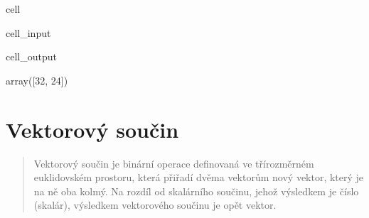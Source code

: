 \documentclass[letterpaper,10pt,english]{jupyterBook}
\begin{document}
\begin{sphinxuseclass}{cell}\begin{sphinxVerbatimInput}

\begin{sphinxuseclass}{cell_input}
\begin{sphinxVerbatim}[commandchars=\\\{\}]
  \PYG{p}{[}\PYG{p}{[}  \PYG{p}{]} \PYG{p}{[}  \PYG{p}{]}\PYG{p}{]}
  \PYG{p}{[}\PYG{p}{[}  \PYG{p}{]} \PYG{p}{[}  \PYG{p}{]}\PYG{p}{]}
 
\end{sphinxVerbatim}

\end{sphinxuseclass}\end{sphinxVerbatimInput}
\begin{sphinxVerbatimOutput}

\begin{sphinxuseclass}{cell_output}
\begin{sphinxVerbatim}[commandchars=\\\{\}]
array([32, 24])
\end{sphinxVerbatim}

\end{sphinxuseclass}\end{sphinxVerbatimOutput}

\end{sphinxuseclass}

\section{Vektorový součin}
\label{\detokenize{Prednasky/0_2_Skal_xe1ry_a_vektory:vektorovy-soucin}}\begin{quote}

\sphinxAtStartPar
Vektorový součin je binární operace definovaná ve třírozměrném euklidovském prostoru, která přiřadí dvěma vektorům nový vektor, který je na ně oba kolmý. Na rozdíl od skalárního součinu, jehož výsledkem je číslo (skalár), výsledkem vektorového součinu je opět vektor.
\end{quote}
\end{document}
